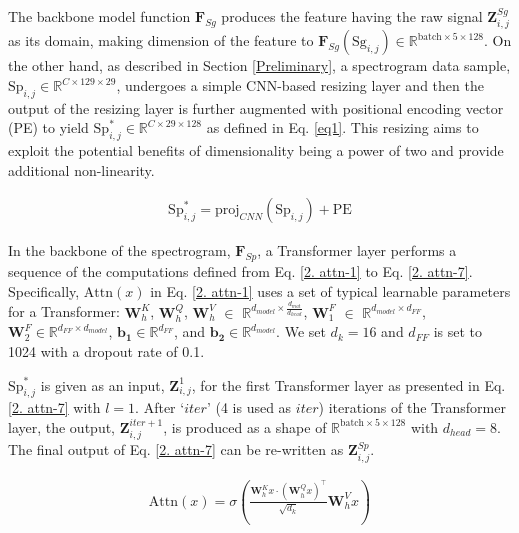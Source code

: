 The backbone model function $\mathbf{F}_{Sg}$ produces the feature having the raw signal $\mathbf{Z}^{Sg}_{i, j}$ as its domain, making dimension of the feature to $\mathbf{F}_{Sg}(\text{Sg}_{i, j}) \in \mathbb{R}^{\text{batch} \times 5 \times 128}$.
%
On the other hand, as described in Section \ref{Preliminary}, a spectrogram data sample, $\text{Sp}_{i,j} \in \mathbb{R}^{C \times 129 \times 29}$, undergoes a simple CNN-based resizing layer and then the output of the resizing layer is further augmented with positional encoding vector (PE) to yield $\text{Sp}^*_{i,j} \in \mathbb{R}^{C \times 29 \times 128}$ as defined in Eq. \ref{eq1}.
% 
This resizing aims to exploit the potential benefits of dimensionality being a power of two and provide additional non-linearity.

\vspace{-10pt}

\begin{align}
\label{eq1}
\text{Sp}^*_{i, j} = \text{proj}_{CNN}(\text{Sp}_{i, j}) + \text{PE}
\end{align}

In the backbone of the spectrogram, $\textbf{F}_{Sp}$, a Transformer layer performs a sequence of the computations defined from Eq. \ref{2. attn-1} to Eq. \ref{2. attn-7}.
Specifically, $\text{Attn}(x)$ in Eq. \ref{2. attn-1} uses a set of typical learnable parameters for a Transformer: $\mathbf{W}^K_h$, $\mathbf{W}^Q_h$, $\mathbf{W}^V_h$ $\in$ $\mathbb{R}^{d_{model} \times \frac{d_{mat}}{d_{head}}}$, $\mathbf{W}^{F}_{1}$ $\in$ $\mathbb{R}^{d_{model} \times d_{FF}}$, $\mathbf{W}^F_{2} \in \mathbb{R}^{d_{FF} \times d_{model}}$, $\mathbf{b_1} \in \mathbb{R}^{d_{FF}}$, and $\mathbf{b_2} \in \mathbb{R}^{d_{model}}$. We set $d_k = 16$ and $d_{FF}$ is set to 1024 with a dropout rate of 0.1. 

$\text{Sp}^{*}_{i,j}$ is given as an input, $\mathbf{Z}^{1}_{i, j}$, for the first Transformer layer as presented in Eq. \ref{2. attn-7} with $l=1$.
%
After `$iter$' (4 is used as $iter$) iterations of the Transformer layer, the output, $\mathbf{Z}^{iter+1}_{i, j}$, is produced as a shape of $\mathbb{R}^{\text{batch} \times 5 \times 128}$ with $d_{head} = 8$. The final output of Eq. \ref{2. attn-7} can be re-written as $\mathbf{Z}^{Sp}_{i, j}$. 



\vspace{-15pt}
\begin{align}
\label{2. attn-1}
\text{Attn}(x) = \sigma\left(\frac{\mathbf{W}^K_h x \cdot (\mathbf{W}^Q_h x)^ \top}{\sqrt{d_k}} \mathbf{W}^V_h x\right) 
\end{align}
\vspace{-20pt}

